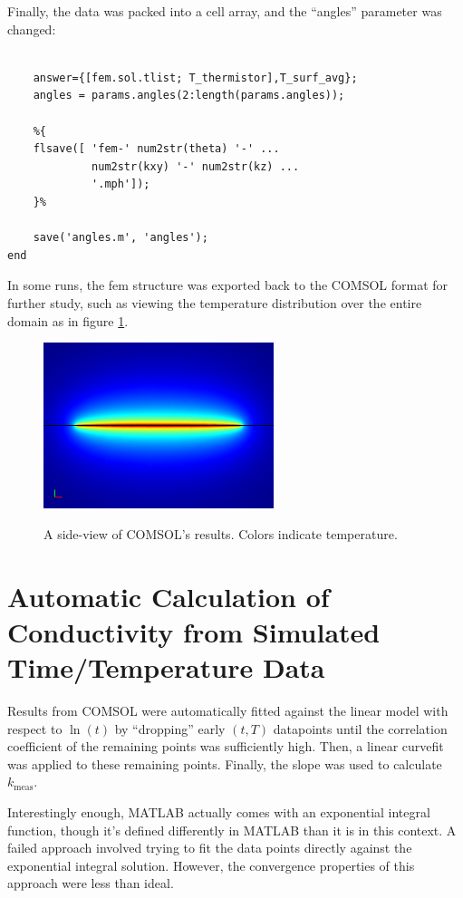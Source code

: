 Finally, the data was packed into a cell array, and the ``angles'' parameter
was changed:

\small
\begin{verbatim}

    answer={[fem.sol.tlist; T_thermistor],T_surf_avg};
    angles = params.angles(2:length(params.angles));

    %{
    flsave([ 'fem-' num2str(theta) '-' ...
             num2str(kxy) '-' num2str(kz) ...
             '.mph']);
    }%

    save('angles.m', 'angles');
end
\end{verbatim}
\normalsize

In some runs, the fem structure was exported back to the COMSOL format for
further study, such as viewing the temperature distribution over the entire
domain as in figure \ref{fig:comsol}.

\begin{figure}[h]
\centering
\includegraphics[width=0.6\textwidth]{fig/35892_elem_1097s.png}
\label{fig:comsol}
\caption{A side-view of COMSOL's results. Colors indicate temperature.}
\end{figure}

\section{Automatic Calculation of Conductivity from Simulated Time/Temperature Data}

Results from COMSOL were automatically fitted against the linear model with
respect to \(\ln(t)\) by ``dropping'' early \((t,T)\) datapoints until the
correlation coefficient of the remaining points was sufficiently high. Then, a
linear curvefit was applied to these remaining points. Finally, the slope was
used to calculate \(k_{\textrm{meas}}\).

Interestingly enough, MATLAB actually comes with an exponential integral
function, though it's defined differently in MATLAB than it is in this context.
A failed approach involved trying to fit the data points directly against the
exponential integral solution. However, the convergence properties of this
approach were less than ideal.

